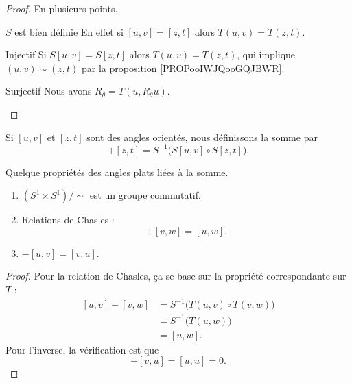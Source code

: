 \begin{proof}
    En plusieurs points.
    \begin{subproof}
    \item[\( S\) est bien définie]
        En effet si \( [u,v]=[z,t]\) alors \( T(u,v)=T(z,t)\).
    \item[Injectif]
        Si \( S[u,v]=S[z,t]\) alors \( T(u,v)=T(z,t)\), qui implique \( (u,v)\sim (z,t)\) par la proposition \ref{PROPooIWJQooGQJBWR}.
    \item[Surjectif]
        Nous avons \( R_{\theta}=T(u,R_{\theta}u)\).
    \end{subproof}
\end{proof}

\begin{definition}
    Si \( [u,v]\) et \( [z,t]\) sont des angles orientés, nous définissons la somme par
    \begin{equation}
        [u,v]+[z,t]=S^{-1}\Big( S[u,v]\circ S[z,t] \Big).
    \end{equation}
\end{definition}

\begin{lemma}       \label{LEMooWISVooYsStJp}
    Quelque propriétés des angles plats liées à la somme.
    \begin{enumerate}
        \item
            \( (S^1\times S^1)/\sim\) est un groupe commutatif.
        \item       \label{ITEMooBKTFooWbEvIU}
            Relations de Chasles :
            \begin{equation}
                [u,v]+[v,w]=[u,w].
            \end{equation}
        \item
            \( -[u,v]=[v,u]\).
    \end{enumerate}
\end{lemma}

\begin{proof}
    Pour la relation de Chasles, ça se base sur la propriété correspondante sur \( T\) :
    \begin{subequations}
        \begin{align}
            [u,v]+[v,w]&=S^{-1}\Big( T(u,v)\circ T(v,w) \Big)\\
            &=S^{-1}\big( T(u,w) \big)\\
            &=[u,w].
        \end{align}
    \end{subequations}
    Pour l'inverse, la vérification est que
    \begin{equation}
        [u,v]+[v,u]=[u,u]=0.
    \end{equation}
\end{proof}

